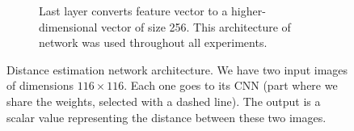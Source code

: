 \begin{figure}[ht!]
\begin{subfigure}[t]{0.47\linewidth}
        \caption{%
           Last layer converts feature vector to a higher-dimensional vector of size 256. This architecture of network was used throughout all experiments.
        }\label{fig:de-architecture:256d}
    \end{subfigure}
    \caption{%
        Distance estimation network architecture.
        We have two input images of dimensions $116 \times 116$.
        Each one goes to its CNN (part where we share the weights, selected with a dashed line).
        The output is a scalar value representing the distance between these two images.
    }\label{fig:de-architecture}
\end{figure}